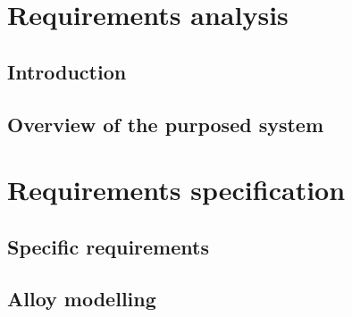 \documentclass[openright]{report}
\newcommand\blankpage{%
    \null
    \thispagestyle{empty}%
    \addtocounter{page}{-1}%
    \newpage}
\begin{document}
	\begin{titlepage}
		
	\end{titlepage}


    \tableofcontents

    \newpage
    \blankpage
    \begin{abstract}
		
	\end{abstract}


	\part{Requirements analysis}
    \chapter{Introduction}
    	
    \chapter{Overview of the purposed system}
	    


    \newpage
    \blankpage
    \renewcommand{\abstractname}{Developer Overview}
    \begin{abstract}
		
	\end{abstract}

	\part{Requirements specification}
	\chapter{Specific requirements}
		
	\chapter{Alloy modelling}
		
\end{document}
